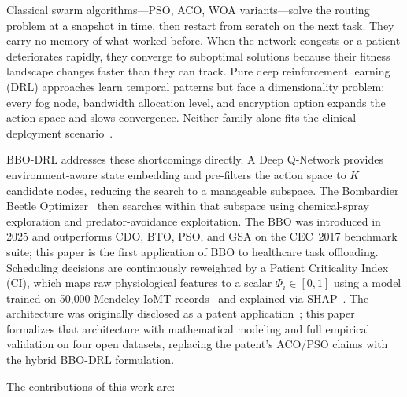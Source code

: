 \documentclass[journal]{IEEEtran}
\begin{document}
Classical swarm algorithms---PSO, ACO, WOA variants---solve the
routing problem at a snapshot in time, then restart from scratch on
the next task. They carry no memory of what worked before. When
the network congests or a patient deteriorates rapidly, they converge
to suboptimal solutions because their fitness landscape changes faster
than they can track. Pure deep reinforcement learning (DRL) approaches
learn temporal patterns but face a dimensionality problem: every fog
node, bandwidth allocation level, and encryption option expands the
action space and slows convergence. Neither family alone fits the
clinical deployment scenario~\cite{mnih2015}.

BBO-DRL addresses these shortcomings directly. A Deep Q-Network
provides environment-aware state embedding and pre-filters the action
space to $K$ candidate nodes, reducing the search to a manageable
subspace. The Bombardier Beetle Optimizer~\cite{bbo2025} then searches
within that subspace using chemical-spray exploration and
predator-avoidance exploitation. The BBO was introduced in 2025 and
outperforms CDO, BTO, PSO, and GSA on the CEC~2017 benchmark suite;
this paper is the first application of BBO to healthcare task
offloading. Scheduling decisions are continuously reweighted by a
Patient Criticality Index (CI), which maps raw physiological features
to a scalar $\Phi_i \in [0,1]$ using a model trained on 50{,}000
Mendeley IoMT records~\cite{mendeley_iomt} and explained via
SHAP~\cite{shap2017}. The architecture was originally disclosed as a
patent application~\cite{patent2024}; this paper formalizes that
architecture with mathematical modeling and full empirical validation
on four open datasets, replacing the patent's ACO/PSO claims with
the hybrid BBO-DRL formulation.

The contributions of this work are:
\end{document}
